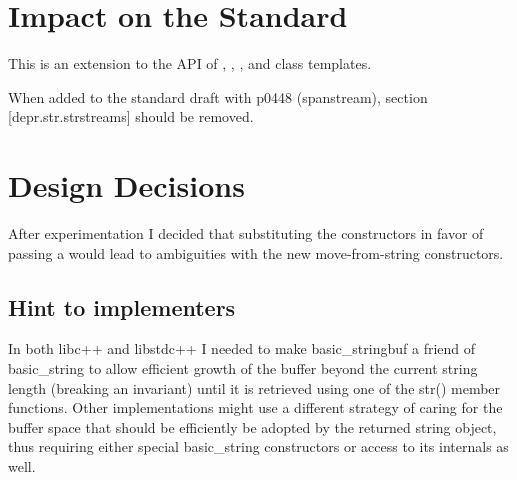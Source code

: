 \documentclass[ebook,11pt,article]{memoir}
\begin{document}


\chapter{Impact on the Standard}
This is an extension to the API of , , , and  class templates.

When added to the standard draft with p0448 (spanstream), section [depr.str.strstreams] should be removed.


\chapter{Design Decisions}
After experimentation I decided that substituting the  constructors in favor of passing a  would lead to ambiguities with the new move-from-string constructors.

\section{Hint to implementers}
In both libc++ and libstdc++ I needed to make basic_stringbuf a friend of basic_string to allow efficient growth of the buffer beyond the current string length (breaking an invariant) until it is retrieved using one of the str() member functions. Other implementations might use a different strategy of caring for the buffer space that should be efficiently be adopted by the returned string object, thus requiring either special basic_string constructors or access to its internals as well.
\end{document}
